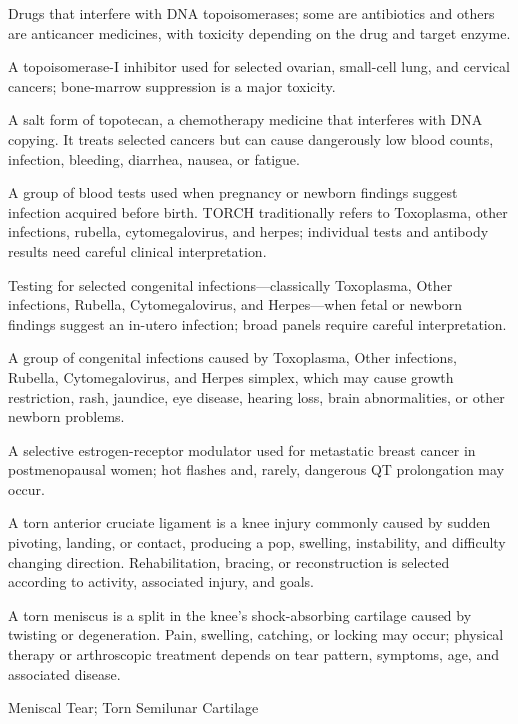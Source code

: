  Drugs that interfere with DNA topoisomerases; some are antibiotics and others are anticancer medicines, with toxicity depending on the drug and target enzyme.

 A topoisomerase-I inhibitor used for selected ovarian, small-cell lung, and cervical cancers; bone-marrow suppression is a major toxicity.

 A salt form of topotecan, a chemotherapy medicine that interferes with DNA copying. It treats selected cancers but can cause dangerously low blood counts, infection, bleeding, diarrhea, nausea, or fatigue.

 A group of blood tests used when pregnancy or newborn findings suggest infection acquired before birth. TORCH traditionally refers to Toxoplasma, other infections, rubella, cytomegalovirus, and herpes; individual tests and antibody results need careful clinical interpretation.

 Testing for selected congenital infections—classically Toxoplasma, Other infections, Rubella, Cytomegalovirus, and Herpes—when fetal or newborn findings suggest an in-utero infection; broad panels require careful interpretation.

 A group of congenital infections caused by Toxoplasma, Other infections, Rubella, Cytomegalovirus, and Herpes simplex, which may cause growth restriction, rash, jaundice, eye disease, hearing loss, brain abnormalities, or other newborn problems.

 A selective estrogen-receptor modulator used for metastatic breast cancer in postmenopausal women; hot flashes and, rarely, dangerous QT prolongation may occur.

 A torn anterior cruciate ligament is a knee injury commonly caused by sudden pivoting, landing, or contact, producing a pop, swelling, instability, and difficulty changing direction. Rehabilitation, bracing, or reconstruction is selected according to activity, associated injury, and goals.

 A torn meniscus is a split in the knee's shock-absorbing cartilage caused by twisting or degeneration. Pain, swelling, catching, or locking may occur; physical therapy or arthroscopic treatment depends on tear pattern, symptoms, age, and associated disease.

\synonyms
Meniscal Tear; Torn Semilunar Cartilage

